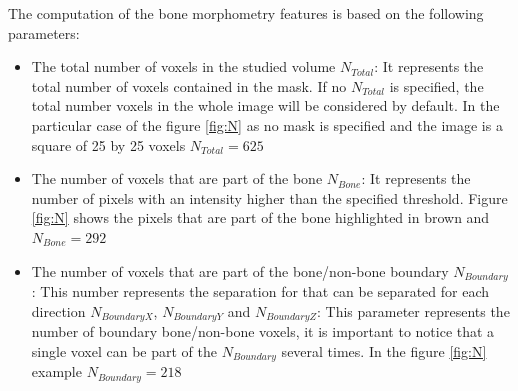 \documentclass{InsightArticle}
\begin{document}
The computation of the bone morphometry features is based on the following parameters:
\begin{itemize}
  \item The total number of voxels in the studied volume \begin{math}  N_{Total} \end{math}: It represents the total number of voxels contained in the mask. If no \begin{math} N_{Total} \end{math} is specified, the total number voxels in the whole image will be considered by default. In the particular case of the figure \ref{fig:N} as no mask is specified and the image is a square of 25 by 25 voxels \begin{math}  N_{Total} = 625 \end{math}
  \item The number of voxels that are part of the bone \begin{math}  N_{Bone} \end{math}: It represents the number of pixels with an intensity higher than the specified threshold. Figure \ref{fig:N} shows the pixels that are part of the bone highlighted in brown and  \begin{math}  N_{Bone} = 292 \end{math}
  \item The number of voxels that are part of the bone/non-bone boundary \begin{math}  N_{Boundary} \end{math}: This number represents the separation for that can be separated for each direction \begin{math}  N_{Boundary X} \end{math}, \begin{math}  N_{Boundary Y} \end{math} and \begin{math}  N_{Boundary Z} \end{math}: This parameter represents the number of boundary bone/non-bone voxels, it is important to notice that a single voxel can be part of the \begin{math}  N_{Boundary} \end{math} several times. In the figure \ref{fig:N} example \begin{math}  N_{Boundary} = 218 \end{math}
\end{itemize}
\end{document}
